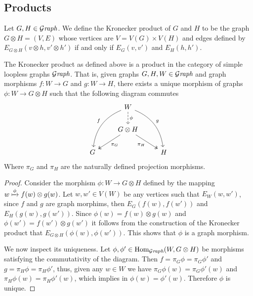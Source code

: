 \subsection{Products}

\begin{definition}
  Let \(G, H \in {\mathcal{G}\textit{raph}}\). We define the Kronecker product of \(G\) and \(H\) to
  be the graph \(G \otimes H = (V, E)\) whose vertices are \(V = V(G) \times
  V(H)\) and edges defined by \(E_{G \otimes H}(v \otimes h, v' \otimes h')\) if
  and only if \(E_G(v, v')\) and \(E_H(h, h')\).
\end{definition}

\begin{proposition}[Products]
  The Kronecker product as defined above is a product in the category of simple
  loopless graphs \({\mathcal{G}\textit{raph}}\). That is, given graphs \(G, H, W \in {\mathcal{G}\textit{raph}}\) and
  graph morphisms \(f: W \to G\) and \(g: W \to H\), there exists a unique
  morphism of graphs \(\phi: W \to G \otimes H\) such that the following diagram
  commutes
  \[
    \begin{tikzcd}
      &W \ar[d, dashed, "\phi"]
      \ar[ddl, bend right, swap, "f"]
      \ar[ddr, bend left, "g"]
      & \\
      &G \otimes H
      \ar[dr, two heads, swap, "\pi_H"]
      \ar[dl, two heads, "\pi_G"]
      & \\
      G & &H
    \end{tikzcd}
  \]
  Where \(\pi_G\) and \(\pi_H\) are the naturally defined projection morphisms.
\end{proposition}

\begin{proof}
  Consider the morphism \(\phi: W \to G \otimes H\) defined by the mapping \(w
  \xmapsto \phi f(w) \otimes g(w)\). Let \(w, w' \in V(W)\) be any vertices such
  that \(E_W(w, w')\), since \(f\) and \(g\) are graph morphims, then
  \(E_G(f(w), f(w'))\) and \(E_H(g(w), g(w'))\). Since \(\phi(w) = f(w) \otimes
  g(w)\) and \(\phi(w') = f(w') \otimes g(w')\) it follows from the construction
  of the Kronecker product that \(E_{G \otimes H}(\phi(w), \phi(w'))\). This
  shows that \(\phi\) is a graph morphism.

  We now inspect its uniqueness. Let \(\phi, \phi' \in \operatorname{Hom}_{\mathcal{G}\textit{raph}}(W, G \otimes
  H)\) be morphisms satisfying the commutativity of the diagram. Then \(f =
  \pi_G \phi = \pi_G \phi'\) and \(g = \pi_H \phi = \pi_H \phi'\), thus, given
  any \(w \in W\) we have \(\pi_G\phi(w) = \pi_G \phi'(w)\) and \(\pi_H \phi(w)
  = \pi_H\phi'(w)\), which implies in \(\phi(w) = \phi'(w)\). Therefore \(\phi\)
  is unique.
\end{proof}
